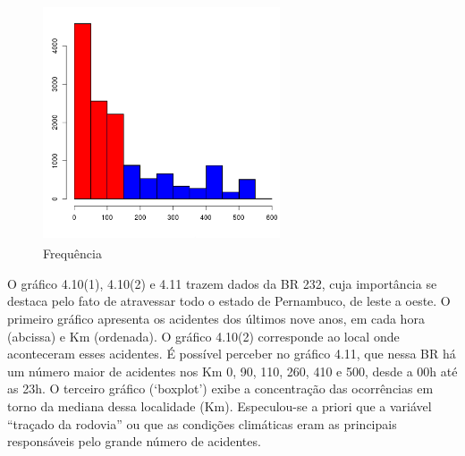 \quad \quad
\begin{figure}[h]
	\centering
	\caption{ Frequência}
	\includegraphics[width=7cm,height=7cm]{Figuras/Preprocess/br232_3.png}
\end{figure}

O gráfico 4.10(1), 4.10(2)  e 4.11 trazem dados da BR 232, cuja importância se destaca pelo fato de atravessar todo o estado de Pernambuco, de leste a oeste. O primeiro gráfico apresenta os acidentes dos últimos nove anos, em cada hora (abcissa) e Km (ordenada). O  gráfico 4.10(2) corresponde ao local onde aconteceram esses acidentes. É possível perceber no gráfico 4.11, que nessa BR há um número maior de acidentes nos Km 0, 90, 110, 260, 410 e 500, desde a 00h até as 23h. O terceiro gráfico (‘boxplot’) exibe a concentração das ocorrências em torno da mediana dessa localidade (Km). 
Especulou-se a priori que a variável “traçado da rodovia” ou que as condições climáticas eram as principais responsáveis pelo grande número de acidentes.



\pagebreak

